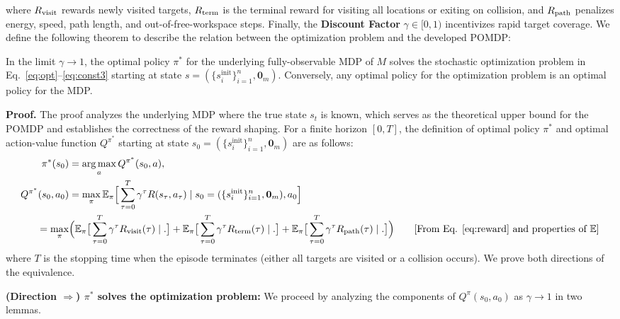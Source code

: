 \documentclass{article}
\begin{document}
where $R_{\mathrm{visit}}$ rewards newly visited targets, $R_{\mathrm{term}}$ is the terminal reward for visiting all locations or exiting on collision, and $R_{\mathrm{path}}$ penalizes energy, speed, path length, and out-of-free-workspace steps. Finally, the \textbf{Discount Factor} $\gamma \in [0,1)$ incentivizes rapid target coverage. We define the following theorem to describe the relation between the optimization problem and the developed POMDP:

\begin{theorem}
\label{thm:optimization}
In the limit $\gamma \to 1$, the optimal policy $\pi^*$ for the underlying fully-observable MDP of $M$ solves the stochastic optimization problem in Eq.~\eqref{eq:opt}--\eqref{eq:const3} starting at state $s = (\{s_i^{\mathrm{init}}\}_{i=1}^n,  \mathbf{0}_m)$. Conversely, any optimal policy for the optimization problem is an optimal policy for the MDP.
\end{theorem}

\textbf{Proof.} The proof analyzes the underlying MDP where the true state $s_t$ is known, which serves as the theoretical upper bound for the POMDP and establishes the correctness of the reward shaping. For a finite horizon $[0,T]$, the definition of optimal policy $\pi^*$ and optimal action-value function $Q^{\pi^*}$ \citep{sutton2018reinforcement} starting at state $s_0 = (\{s_i^{\mathrm{init}}\}_{i=1}^n,  \mathbf{0}_m)$ are as follows:
\begin{align}
    \pi^*(s_0) &= \argmax_a Q^{\pi^*}(s_0, a), \label{eq:opt_pi} \\
    Q^{\pi^*}(s_0, a_0) &= \max_\pi \expectation_\pi \Big[\sum_{\tau=0}^T \gamma^\tau R(s_\tau, a_\tau)  \mid s_0 = (\{s_i^{\mathrm{init}}\}_{i=1}^n,  \mathbf{0}_m) , a_0\Big] \label{eq:opt_policy} \\
    = \max_\pi &\Big( \expectation_\pi \big[ \sum_{\tau=0}^T\gamma^\tau \rvisit(\tau) \mid . \big] + \expectation_\pi \big[ \sum_{\tau=0}^T\gamma^\tau \rterm(\tau) \mid . \big] + \expectation_\pi \big[ \sum_{\tau=0}^T\gamma^\tau \rpath(\tau) \mid . \big] \Big) \tag*{[From Eq. \eqref{eq:reward} and properties of $\mathbb{E}$]}
\end{align}
where $T$ is the stopping time when the episode terminates (either all targets are visited or a collision occurs). We prove both directions of the equivalence.

\textbf{(Direction $\Rightarrow$) $\pi^*$ solves the optimization problem:}
We proceed by analyzing the components of $Q^\pi(s_0, a_0)$ as $\gamma \to 1$ in two lemmas.
\end{document}
